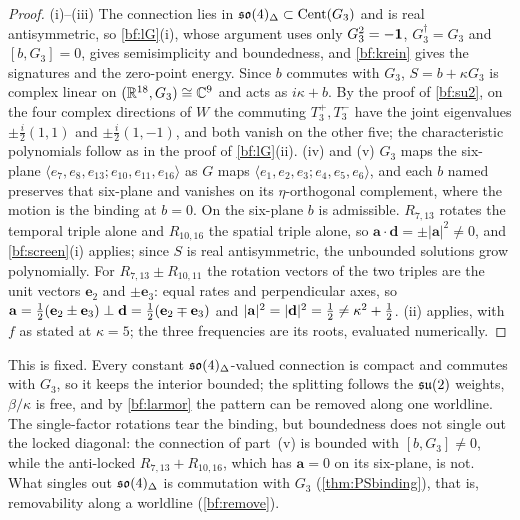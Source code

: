 \begin{proof}
(i)--(iii) The connection lies in $\mathfrak{so}(4)_\Delta\subset\operatorname{Cent}(G_3)$ and is real antisymmetric, so \cref{bf:lG}(i), whose argument uses only
$G_3^2=-\mathbf 1$, $G_3^\dagger=G_3$ and $[b,G_3]=0$, gives semisimplicity and boundedness, and \cref{bf:krein} gives the signatures and the zero-point
energy. Since $b$ commutes with $G_3$, $S=b+\kappa G_3$ is complex linear on $(\mathbb{R}^{18},G_3)\cong\mathbb{C}^9$ and acts as $i\kappa+b$. By the proof of \cref{bf:su2}, on the four
complex directions of $W$ the commuting $T^+_3,T^-_3$ have the joint eigenvalues $\pm\tfrac i2(1,1)$ and $\pm\tfrac i2(1,-1)$, and both vanish on the other five; the
characteristic polynomials follow as in the proof of \cref{bf:lG}(ii). (iv) and (v) $G_3$ maps the six-plane $\langle e_7,e_8,e_{13};e_{10},e_{11},e_{16}\rangle$ as
$G$ maps $\langle e_1,e_2,e_3;e_4,e_5,e_6\rangle$, and each $b$ named preserves that six-plane and vanishes on its $\eta$-orthogonal complement, where
the motion is the binding at $b=0$. On the six-plane $b$ is admissible. $R_{7,13}$ rotates the temporal triple alone and $R_{10,16}$ the spatial
triple alone, so $\mathbf a\cdot\mathbf d=\pm|\mathbf a|^2\neq0$, and \cref{bf:screen}(i) applies; since $S$ is real antisymmetric, the unbounded
solutions grow polynomially. For $R_{7,13}\pm R_{10,11}$ the rotation vectors of the two triples are the unit vectors $\mathbf e_2$ and $\pm\mathbf e_3$:
equal rates and perpendicular axes, so $\mathbf a=\tfrac12(\mathbf e_2\pm\mathbf e_3)\perp\mathbf d=\tfrac12(\mathbf e_2\mp\mathbf e_3)$ and
$|\mathbf a|^2=|\mathbf d|^2=\tfrac12\neq\kappa^2+\tfrac12$. (ii) applies, with $f$ as stated at $\kappa=5$; the three frequencies are its
roots, evaluated numerically.
\end{proof}

This is fixed. Every constant $\mathfrak{so}(4)_\Delta$-valued connection is compact and commutes with $G_3$, so it keeps the interior bounded; the splitting
follows the $\mathfrak{su}(2)$ weights, $\beta/\kappa$ is free, and by \cref{bf:larmor} the pattern can be removed along one worldline. The single-factor
rotations tear the binding, but boundedness does not single out the locked diagonal: the connection of part~(v) is bounded with $[b,G_3]\neq0$,
while the anti-locked $R_{7,13}+R_{10,16}$, which has $\mathbf a=0$ on its six-plane, is not. What singles out $\mathfrak{so}(4)_\Delta$ is commutation with
$G_3$ (\cref{thm:PSbinding}), that is, removability along a worldline (\cref{bf:remove}).

